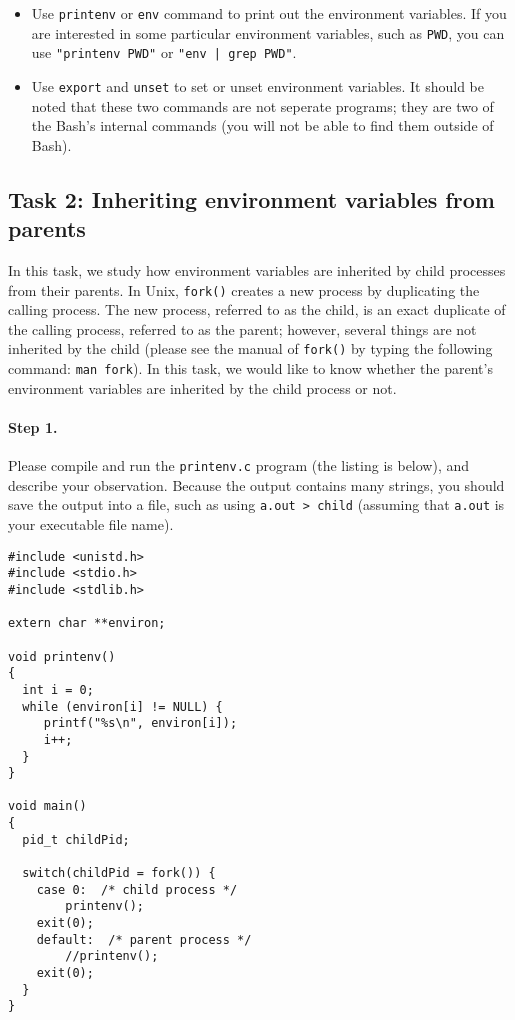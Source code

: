 \begin{itemize}
\item Use {\tt printenv} or {\tt env} command to print out the 
environment variables. If you are interested in some particular 
environment variables, such as {\tt PWD}, you can use {\tt "printenv PWD"}
or {\tt "env | grep PWD"}. 


\item Use {\tt export} and {\tt unset} to set or unset environment
variables. It should be noted that 
these two commands are not seperate programs; they are two of 
the Bash's internal commands (you will not be able to find them
outside of Bash).

\end{itemize}


\subsection{Task 2: Inheriting environment variables from parents}

In this task, we study how environment variables are inherited by 
child processes from their parents. In Unix,
{\tt fork()} creates a new process by duplicating the calling process.
The new process, referred to as the child, is an exact duplicate of the calling 
process, referred to as the parent; however, several things 
are not inherited by the child (please see the manual of {\tt fork()} by
typing the following command: {\tt man fork}). In this task,
we would like to know whether the parent's environment variables
are inherited by the child process or not.


\paragraph{Step 1.} Please compile and run the {\tt printenv.c}
program (the listing is below),  and describe your observation. Because the output 
contains many strings, you should save the output into a file, such as
using {\tt a.out > child} (assuming that {\tt a.out} is your 
executable file name).


\begin{Verbatim}[frame=single]
#include <unistd.h>
#include <stdio.h>
#include <stdlib.h>

extern char **environ;

void printenv()
{
  int i = 0;
  while (environ[i] != NULL) {
     printf("%s\n", environ[i]);
     i++;
  }
}

void main()
{
  pid_t childPid;

  switch(childPid = fork()) {
    case 0:  /* child process */
        printenv();
	exit(0);
    default:  /* parent process */
        //printenv();
	exit(0);
  }
}
\end{Verbatim}

